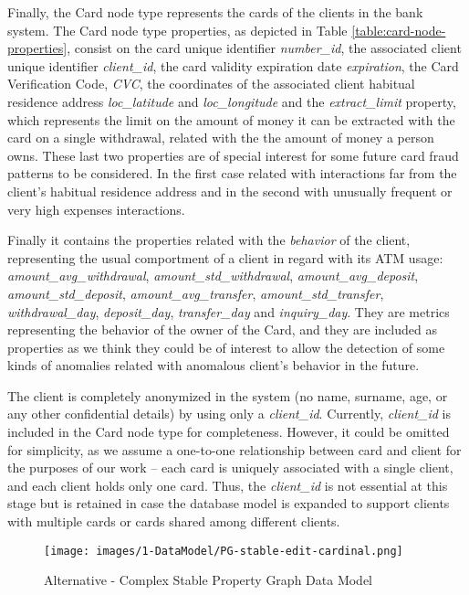 Finally, the Card node type represents the cards of the clients in the bank system. The Card node type properties, as depicted in Table
\ref{table:card-node-properties}, consist on the card unique 
identifier \emph{number\_id}, the associated client unique identifier \emph{client\_id}, the card validity expiration date \emph{expiration}, the Card Verification Code, \emph{CVC}, the coordinates of the associated client habitual residence address \emph{loc\_latitude} and 
\emph{loc\_longitude} and the \emph{extract\_limit} property, which represents the limit on the amount of money it can be extracted with the card on a single withdrawal, related with the the amount of money a person owns. These last two properties are of special interest for some future card fraud patterns to be considered. In the first case related with interactions far from the client's habitual residence address and in the second with unusually frequent or very high expenses interactions.

Finally it contains the properties related with the \emph{behavior} of the client, representing the usual comportment of a client in regard with its ATM usage: \emph{amount\_avg\_withdrawal}, \emph{amount\_std\_withdrawal}, \emph{amount\_avg\_deposit}, 
\emph{amount\_std\_deposit}, \emph{amount\_avg\_transfer},  \emph{amount\_std\_transfer}, \emph{withdrawal\_day}, \emph{deposit\_day}, \emph{transfer\_day} and \emph{inquiry\_day}.
They are metrics representing the behavior of the owner of the Card, and they are included as properties as we think they could be of interest to allow the detection of some kinds of anomalies related with anomalous client's behavior in the future.



The client is completely anonymized in the system (no name, surname, age, or any other confidential details) by using only a \emph{client\_id}. Currently, \emph{client\_id} is included in the Card node type for completeness. However, it could be omitted for simplicity, as we assume a one-to-one relationship between card and client for the purposes of our work -- each card is uniquely associated with a single client, and each client holds only one card. Thus, the \emph{client\_id} is not essential at this stage but is retained in case the database model is expanded to support clients with multiple cards or cards shared among different clients.

\begin{figure}[h]
  \centering
  \texttt{[image: images/1-DataModel/PG-stable-edit-cardinal.png]}
  \caption{Alternative - Complex Stable Property Graph Data Model}
  \label{img:pg-stable-big}
\end{figure}

